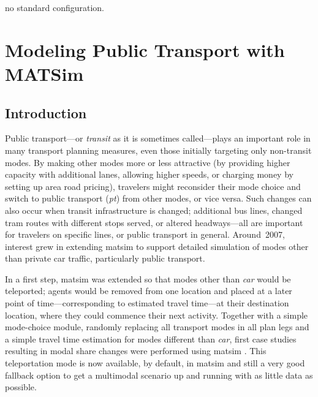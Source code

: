 

\createStandardInformationBasic%
{}%
{}%
{no standard configuration.}%
{\citet{Ordonez_HKSTS_2011}}

\section{Modeling Public Transport with MATSim}
\subsection{Introduction}
Public transport---or \emph{transit} as it is sometimes called---plays
an important role in many transport planning measures, even those initially
targeting only non-transit modes. By making other modes more or less
attractive (\eg by providing higher capacity with additional lanes, allowing
higher speeds, or charging money by setting up area road pricing), travelers
might reconsider their mode choice and switch to public transport (\emph{pt})
from other modes, or vice versa. Such changes can also occur when transit
infrastructure is changed; additional bus lines, changed tram routes with
different stops served, or altered headways---all are important for travelers
on specific lines, or public transport in general. Around~2007,
interest grew in extending \gls{matsim} to support detailed simulation of 
modes other than private car traffic, particularly public transport.

In a first step, \gls{matsim} was extended so that modes other than
\emph{car} would be \gls{teleported}; agents would be removed from one location
and placed at a later point of time---corresponding to estimated travel time---at
their destination location, where they could commence their next activity.
Together with a simple mode-choice module, randomly replacing all 
transport modes in all plan legs and a simple travel time estimation for
modes different than \emph{car}, first case studies resulting in modal share
changes were performed using \gls{matsim}
\citep{RieserGretherNagel2008modeChoiceCalculations,
GretherEtAl2009SimpleModeChoiceIPL}. This \gls{teleportation} mode is now available, by
default, in \gls{matsim} and still a very good fallback option to get a \gls{multimodal} scenario
up and running with as little data as possible.

